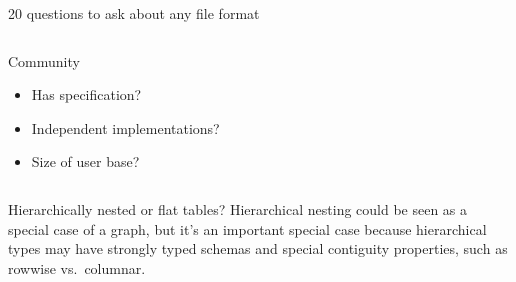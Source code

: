 \documentclass[aspectratio=169]{beamer}
\begin{document}
\begin{frame}{20 questions to ask about any file format}
\begin{columns}
\vspace{-0.2 cm}

\begin{block}{Community}
\vspace{-0.2 cm}
\begin{itemize}\setlength{\itemsep}{-0.05 cm}
\item Has specification?
\item Independent implementations?
\item Size of user base?
\end{itemize}
\end{block}

\end{columns}
\end{frame}

\begin{frame}{Hierarchically nested or flat tables?}
\vspace{0.5 cm}
Hierarchical nesting could be seen as a special case of a graph, but it's an important special case because hierarchical types may have strongly typed schemas and special contiguity properties, such as rowwise vs.\ columnar.

\vspace{0.35 cm}


\end{frame}
\end{document}
